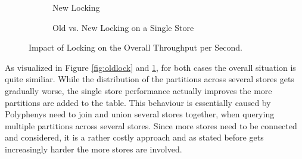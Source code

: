 \begin{figure}[t]
\begin{subfigure}{.5\textwidth}
      \caption{New Locking}
      \label{fig:newlock}
    \end{subfigure}
    \begin{subfigure}{.7\textwidth}
        \centering
        \caption{Old vs. New Locking on a Single Store}
        \label{fig:oldandnewlock}
      \end{subfigure}
    \caption{Impact of Locking on the Overall Throughput per Second.}
    \label{fig:lock_comp}
\end{figure}


As visualized in Figure \ref{fig:oldlock} and \ref{fig:newlock}, for both cases the overall situation is quite similiar.
While the distribution of the partitions across several stores gets gradually worse, the single store performance actually improves the more partitions are added to the table.
This behaviour is essentially caused by Polyphenys need to join and union several stores together, when querying multiple partitions across several stores.
Since more stores need to be connected and considered, it is a rather costly approach and as stated before gets increasingly harder the more stores are involved.\\


